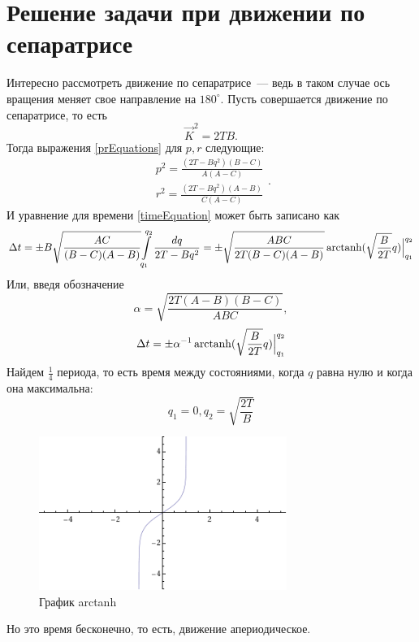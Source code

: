 \documentclass{article}
\DeclareMathOperator\arctanh{arctanh}
\newcommand{\degree}{^{\circ}}
\begin{document}
\section{Решение задачи при движении по сепаратрисе}
Интересно рассмотреть движение по сепаратрисе~--- ведь в таком случае ось вращения меняет свое направление на \begin{math}180\degree\end{math}.
Пусть совершается движение по сепаратрисе, то есть
\begin{equation}
\vec{K}^2=2TB.
\end{equation}
Тогда выражения \ref{prEquations} для \begin{math} p, r \end{math} следующие:
\begin{equation}
\begin{array}{l}
p^2=\frac{(2T-Bq^2)(B-C)}{A(A-C)}\\
r^2=\frac{(2T-Bq^2)(A-B)}{C(A-C)}
\end{array}.
\end{equation}
И уравнение для времени \ref{timeEquation} может быть записано как
\begin{equation}
\Delta t=\pm B\sqrt{\frac{AC}{(B-C)(A-B)}}{\int\limits_{q_1}^{q_2}\frac{dq}{2T-Bq^2}}=
\pm\sqrt{\frac{ABC}{2T(B-C)(A-B)}}\arctanh(\sqrt{\frac{B}{2T}}q)\Bigl|_{q_1}^{q_2}
\end{equation}
Или, введя обозначение
\begin{equation}
\label{alphaEquation}
\alpha=\sqrt{\frac{2T(A-B)(B-C)}{ABC}},
\end{equation}
\begin{equation}
\label{thEquation}
\Delta t=\pm\alpha^{-1}\arctanh(\sqrt{\frac{B}{2T}}q)\Bigl|_{q_1}^{q_2}
\end{equation}
Найдем \begin{math} \frac{1}{4} \end{math} периода, то есть время между состояниями, когда \begin{math} q \end{math} равна нулю и когда она максимальна:
\begin{equation}
q_1=0, q_2=\sqrt{\frac{2T}{B}}
\end{equation}
\begin{figure}[h]
\includegraphics[height=5cm]{ArcTanh}
\caption{График arctanh}
\end{figure}
Но это время бесконечно, то есть, движение апериодическое.
\end{document}
